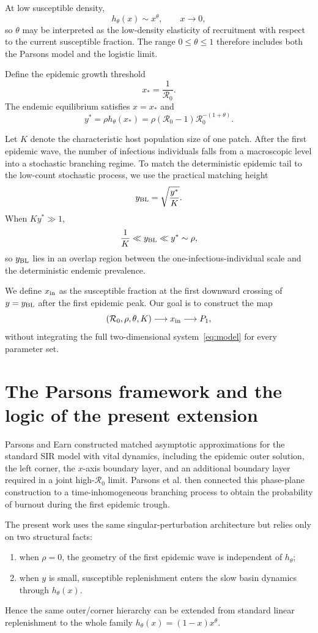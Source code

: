 \documentclass[11pt,a4paper]{article}
\newcommand{\Rzero}{\mathcal R_0}
\newcommand{\BL}{y_{\rm BL}}
\newcommand{\xin}{x_{\rm in}}
\newcommand{\xs}{x_*}
\newcommand{\Pone}{P_1}
\begin{document}
At low susceptible density,
\[
h_\theta(x)\sim x^\theta,
\qquad x\to0,
\]
so $\theta$ may be interpreted as the low-density elasticity of recruitment with respect to the current susceptible fraction. The range $0\leq\theta\leq1$ therefore includes both the Parsons model and the logistic limit.

Define the epidemic growth threshold
\begin{equation}
\label{eq:xstar}
\xs=\frac1{\Rzero}.
\end{equation}
The endemic equilibrium satisfies $x=\xs$ and
\begin{equation}
\label{eq:ystar}
y^*=\rho h_\theta(\xs)
=\rho(\Rzero-1)\Rzero^{-(1+\theta)}.
\end{equation}

Let $K$ denote the characteristic host population size of one patch. After the first epidemic wave, the number of infectious individuals falls from a macroscopic level into a stochastic branching regime. To match the deterministic epidemic tail to the low-count stochastic process, we use the practical matching height
\begin{equation}
\label{eq:ybl}
\BL=\sqrt{\frac{y^*}{K}}.
\end{equation}
When $Ky^*\gg1$,
\[
\frac1K\ll\BL\ll y^*\sim\rho,
\]
so $\BL$ lies in an overlap region between the one-infectious-individual scale and the deterministic endemic prevalence.

We define $\xin$ as the susceptible fraction at the first downward crossing of $y=\BL$ after the first epidemic peak. Our goal is to construct the map
\[
(\Rzero,\rho,\theta,K)
\longrightarrow \xin
\longrightarrow \Pone,
\]
without integrating the full two-dimensional system~\eqref{eq:model} for every parameter set.

\section{The Parsons framework and the logic of the present extension}
Parsons and Earn constructed matched asymptotic approximations for the standard SIR model with vital dynamics, including the epidemic outer solution, the left corner, the $x$-axis boundary layer, and an additional boundary layer required in a joint high-$\Rzero$ limit\cite{PE2024}. Parsons et al. then connected this phase-plane construction to a time-inhomogeneous branching process to obtain the probability of burnout during the first epidemic trough\cite{PNAS2024}.

The present work uses the same singular-perturbation architecture but relies only on two structural facts:
\begin{enumerate}
\item when $\rho=0$, the geometry of the first epidemic wave is independent of $h_\theta$;
\item when $y$ is small, susceptible replenishment enters the slow basin dynamics through $h_\theta(x)$.
\end{enumerate}
Hence the same outer/corner hierarchy can be extended from standard linear replenishment to the whole family $h_\theta(x)=(1-x)x^\theta$.
\end{document}
